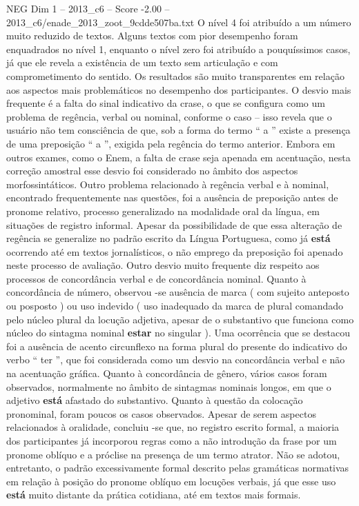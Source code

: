 \begin{textsample}{NEG Dim 1 – 2013\_c6 – Score -2.00 – 2013\_c6/enade\_2013\_zoot\_9cdde507ba.txt}
O nível 4 foi atribuído a um número muito reduzido de textos.
Alguns textos com pior desempenho foram enquadrados no nível 1, enquanto o nível zero foi atribuído a pouquíssimos casos, já que ele revela a existência de um texto sem articulação e com comprometimento do sentido.
Os resultados são muito transparentes em relação aos aspectos mais problemáticos no desempenho dos participantes.
O desvio mais frequente é a falta do sinal indicativo da crase, o que se configura como um problema de regência, verbal ou nominal, conforme o caso – isso revela que o usuário não tem consciência de que, sob a forma do termo “ a ” existe a presença de uma preposição “ a ”, exigida pela regência do termo anterior.
Embora em outros exames, como o Enem, a falta de crase seja apenada em acentuação, nesta correção amostral esse desvio foi considerado no âmbito dos aspectos morfossintáticos.
Outro problema relacionado à regência verbal e à nominal, encontrado frequentemente nas questões, foi a ausência de preposição antes de pronome relativo, processo generalizado na modalidade oral da língua, em situações de registro informal.
Apesar da possibilidade de que essa alteração de regência se generalize no padrão escrito da Língua Portuguesa, como já \textbf{está} ocorrendo até em textos jornalísticos, o não emprego da preposição foi apenado neste processo de avaliação.
Outro desvio muito frequente diz respeito aos processos de concordância verbal e de concordância nominal.
Quanto à concordância de número, observou -se ausência de marca ( com sujeito anteposto ou posposto ) ou uso indevido ( uso inadequado da marca de plural comandado pelo núcleo plural da locução adjetiva, apesar de o substantivo que funciona como núcleo do sintagma nominal \textbf{estar} no singular ).
Uma ocorrência que se destacou foi a ausência de acento circunflexo na forma plural do presente do indicativo do verbo “ ter ”, que foi considerada como um desvio na concordância verbal e não na acentuação gráfica.
Quanto à concordância de gênero, vários casos foram observados, normalmente no âmbito de sintagmas nominais longos, em que o adjetivo \textbf{está} afastado do substantivo.
Quanto à questão da colocação pronominal, foram poucos os casos observados.
Apesar de serem aspectos relacionados à oralidade, concluiu -se que, no registro escrito formal, a maioria dos participantes já incorporou regras como a não introdução da frase por um pronome oblíquo e a próclise na presença de um termo atrator.
Não se adotou, entretanto, o padrão excessivamente formal descrito pelas gramáticas normativas em relação à posição do pronome oblíquo em locuções verbais, já que esse uso \textbf{está} muito distante da prática cotidiana, até em textos mais formais.

\end{textsample}
